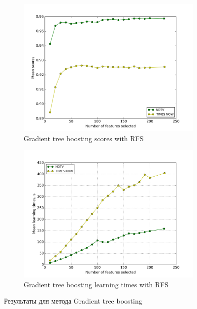 \begin{figure}[h!]
    \centering
	\begin{subfigure}{0.45\textwidth}
		\includegraphics[width=\textwidth]{images/RFS-GTB.png}
		\caption{Gradient tree boosting scores with RFS}
	\end{subfigure}
	\begin{subfigure}{0.45\textwidth}
		\includegraphics[width=\textwidth]{images/RFS-GTBTime.png}
		\caption{Gradient tree boosting learning times with RFS}
	\end{subfigure}
	\caption{Результаты для метода Gradient tree boosting}\label{fig:gtb_rfs}
\end{figure}
\par
